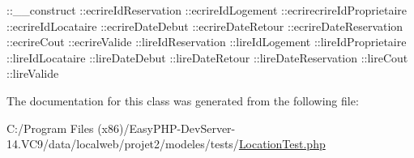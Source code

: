 \+::\+\_\+\+\_\+construct  \+::ecrire\+Id\+Reservation  \+::ecrire\+Id\+Logement  \+::ecrirecrire\+Id\+Proprietaire  \+::ecrire\+Id\+Locataire  \+::ecrire\+Date\+Debut  \+::ecrire\+Date\+Retour  \+::ecrire\+Date\+Reservation  \+::ecrire\+Cout  \+::ecrire\+Valide  \+::lire\+Id\+Reservation  \+::lire\+Id\+Logement  \+::lire\+Id\+Proprietaire  \+::lire\+Id\+Locataire  \+::lire\+Date\+Debut  \+::lire\+Date\+Retour  \+::lire\+Date\+Reservation  \+::lire\+Cout  \+::lire\+Valide 

The documentation for this class was generated from the following file\+:\begin{DoxyCompactItemize}
\item 
C\+:/\+Program Files (x86)/\+Easy\+P\+H\+P-\/\+Dev\+Server-\/14.\+V\+C9/data/localweb/projet2/modeles/tests/\hyperlink{_location_test_8php}{Location\+Test.\+php}\end{DoxyCompactItemize}
